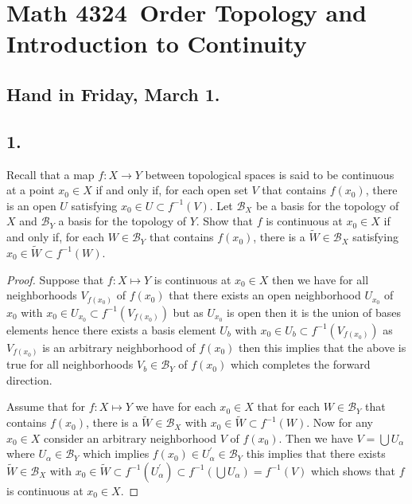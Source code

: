 \documentclass{amsart}
\theoremstyle{plain}
\theoremstyle{definition}
\theoremstyle{remark}
\begin{document}
\section*{Math 4324\  Order Topology and Introduction to Continuity } 

\subsection*{Hand in Friday, March 1.} 




\vspace{.15in}
\noindent
\subsection*{1.}  Recall that a map $f : X \rightarrow Y$ between topological spaces is said to be continuous at a point $x_0 \in X$ if and only if, for each open set $V$ that contains $f(x_0)$, there is an open $U$ satisfying $x_0 \in U \subset f^{-1}(V)$. Let $\mathcal B _X$ be a basis for the topology of $X$ and $\mathcal B _Y$ a basis for the topology of $Y$. Show that $f$ is continuous at $x_0 \in X$ if and only if, for each $W\in \mathcal B _Y$ that contains $f(x_0)$, there is a $\widetilde{W} \in \mathcal B _X$ satisfying $x_0 \in \widetilde{W} \subset f^{-1} (W)$. 


\begin{proof}
    Suppose that $f:X\mapsto Y$ is continuous at $x_0\in X$ then we have for all neighborhoods $V_{f(x_0)}$ of $f(x_0)$ that there exists an open neighborhood $U_{x_0}$ of $x_0$ with $x_0\in U_{x_0}\subset f^{-1}(V_{f(x_0)})$ but as $U_{x_0}$ is open then it is the union of bases elements hence there exists a basis element $U_{b}$ with $x_0\in U_{b}\subset f^{-1}(V_{f(x_0)})$ as $V_{f(x_0)}$ is an arbitrary neighborhood of $f(x_0)$ then this implies that the above is true for all neighborhoods $V_{b}\in \mathcal B_Y$ of $f(x_0)$ which completes the forward direction. 

    Assume that for $f:X\mapsto Y$ we have for each $x_0\in X$ that for each $W\in \mathcal B_Y$ that contains $f(x_0)$, there is a $\widetilde{W}\in \mathcal B_X$ with $x_0\in \widetilde{W} \subset f^{-1}(W)$. Now for any $x_0\in X$ consider an arbitrary neighborhood $V$ of $f(x_0)$. Then we have $V=\bigcup U_\alpha $ where $U_\alpha \in \mathcal B_Y $ which implies $f(x_0)\in U_{\alpha}^\prime\in \mathcal B_Y $ this implies that there exists $\widetilde{W} \in \mathcal B_X$ with $x_0\in \widetilde{W}\subset  f^{-1}(U_{\alpha}^\prime)\subset f^{-1}(\bigcup U_\alpha)=f^{-1}(V)$ which shows that $f$ is continuous at $x_0\in X$.

\end{proof}
\end{document}
